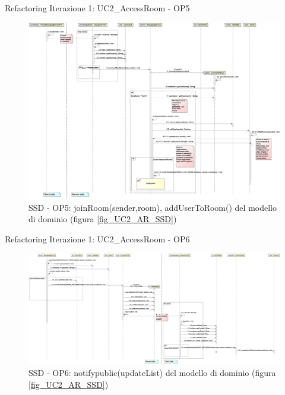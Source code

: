 \begin{frame} {Refactoring Iterazione 1: UC2\_AccessRoom - OP5}
   \begin{figure}
     \includegraphics[scale=0.075]{image_astah/Iteration_1_DesignModel_Refactored/UC2_AccessRoom_SSD_5_join_add.png}{\centering}
     \caption{SSD - OP5: joinRoom(sender,room), addUserToRoom() del modello di dominio (figura \ref{fig_UC2_AR_SSD}) }
     \label{fig_UC2_SSDR_AC_5} 
   \end{figure}
\end{frame}

\begin{frame} {Refactoring Iterazione 1: UC2\_AccessRoom - OP6}
   \begin{figure}
     \includegraphics[scale=0.077]{image_astah/Iteration_1_DesignModel_Refactored/UC2_AccessRoom_SSD_6_notifypublic.png}{\centering}
     \caption{SSD - OP6: notifypublic(updateList) del modello di dominio (figura \ref{fig_UC2_AR_SSD}) }
     \label{fig_UC2_SSDR_AC_6} 
   \end{figure}
\end{frame}

